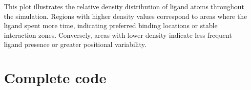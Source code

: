 \documentclass[a4paper,10pt,english]{sphinxmanual}
\begin{document}
\sphinxAtStartPar
{} This plot illustrates the relative density distribution of ligand atoms throughout the simulation. Regions with higher density values correspond to areas where the ligand spent more time, indicating preferred binding locations or stable interaction zones. Conversely, areas with lower density indicate less frequent ligand presence or greater positional variability.


\section{Complete code}
\label{\detokenize{Ligand Density:complete-code}}
\begin{sphinxVerbatim}[commandchars=\\\{\}]
\end{sphinxVerbatim}

\begin{sphinxVerbatim}[commandchars=\\\{\}]
\end{sphinxVerbatim}
\end{document}
